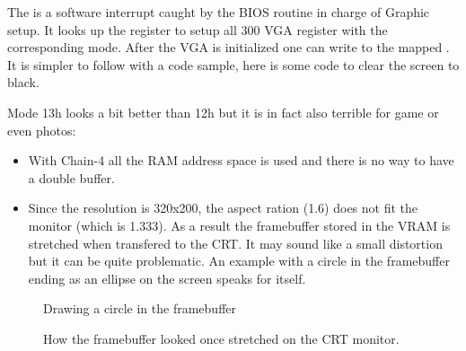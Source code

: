\documentclass[book.tex]{subfiles}
\begin{document}
  \par
  The  is a software interrupt caught by the BIOS routine in charge of Graphic setup. It looks up the  register to setup all 300 VGA register with the corresponding mode. After the VGA is initialized one can write to the mapped . It is simpler to follow with a code sample, here is some code to clear the screen to black.\\
  
  \begin{minipage}{\textwidth}
  
  \end{minipage}
  \par
  Mode 13h looks a bit better than 12h but it is in fact also terrible for game or even photos:\\
  \begin{itemize}
\item With Chain-4 all the RAM address space is used and there is no way to have a double buffer.
\item Since the resolution is 320x200, the aspect ration (1.6) does not fit the monitor (which is 1.333). As a result the framebuffer stored in the VRAM is stretched when transfered to the CRT. It may sound like a small distortion but it can be quite problematic. An example with a circle in the framebuffer ending as an ellipse on the screen speaks for itself.
\end{itemize}

\begin{figure}[H]
  \centering
  \caption{Drawing a circle in the framebuffer}
\end{figure}

\begin{figure}[H]
  \centering
  \caption{How the framebuffer looked once stretched on the CRT monitor.}
\end{figure}
\par
\end{document}
